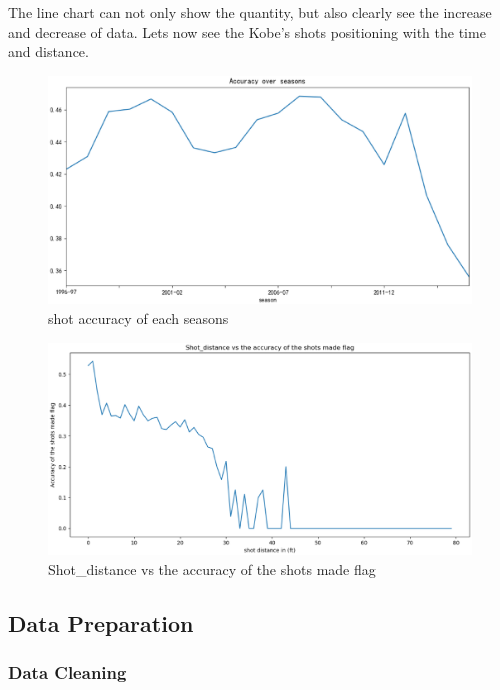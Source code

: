 The line chart can not only show the quantity, but also clearly see the increase and decrease of data.
Lets now see the Kobe's shots positioning with the time and distance.

\begin{figure}[H]
	\centering
	\includegraphics[scale=0.2]{m.eps
	}        %
	\caption{shot accuracy of each seasons}
	\label{fig5}
\end{figure}

\begin{figure}[H]
	\centering
	\includegraphics[scale=0.2]{s.eps
	}        %
	\caption{Shot_distance vs the accuracy of the shots made flag}
	\label{fig6}
\end{figure}


\subsection{Data Preparation}

\subsubsection{Data Cleaning}
\

